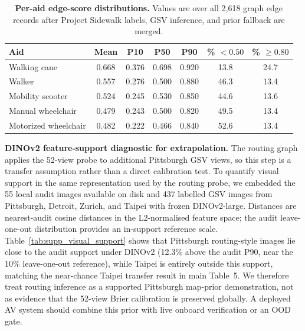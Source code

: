 \documentclass[conference]{IEEEtran}
\begin{document}
\begin{table}[!t]
\caption{\textbf{Per-aid edge-score distributions.} Values are over all 2,618 graph edge records after Project Sidewalk labels, GSV inference, and prior fallback are merged.}
\label{tab:supp_edge_dist}
\centering\scriptsize
\setlength{\tabcolsep}{5pt}
\begin{tabular}{@{}lcccccc@{}}
\toprule
\textbf{Aid} & \textbf{Mean} & \textbf{P10} & \textbf{P50} & \textbf{P90} & \textbf{\% $<0.50$} & \textbf{\% $\geq0.80$} \\
\midrule
Walking cane         & 0.668 & 0.376 & 0.698 & 0.920 & 13.8 & 24.7 \\
Walker               & 0.557 & 0.276 & 0.500 & 0.880 & 46.3 & 13.4 \\
Mobility scooter     & 0.524 & 0.245 & 0.530 & 0.850 & 44.6 & 13.6 \\
Manual wheelchair    & 0.479 & 0.243 & 0.500 & 0.820 & 49.5 & 13.4 \\
Motorized wheelchair & 0.482 & 0.222 & 0.466 & 0.840 & 52.6 & 13.4 \\
\bottomrule
\end{tabular}
\end{table}

\textbf{DINOv2 feature-support diagnostic for extrapolation.} The routing graph applies the 52-view probe to additional Pittsburgh GSV views, so this step is a transfer assumption rather than a direct calibration test. To quantify visual support in the same representation used by the routing probe, we embedded the 55 local audit images available on disk and 437 labelled GSV images from Pittsburgh, Detroit, Zurich, and Taipei with frozen DINOv2-large. Distances are nearest-audit cosine distances in the L2-normalised feature space; the audit leave-one-out distribution provides an in-support reference scale. Table~\ref{tab:supp_visual_support} shows that Pittsburgh routing-style images lie close to the audit support under DINOv2 (12.3\% above the audit P90, near the 10\% leave-one-out reference), while Taipei is entirely outside this support, matching the near-chance Taipei transfer result in main Table~5. We therefore treat routing inference as a supported Pittsburgh map-prior demonstration, not as evidence that the 52-view Brier calibration is preserved globally. A deployed AV system should combine this prior with live onboard verification or an OOD gate.
\end{document}
